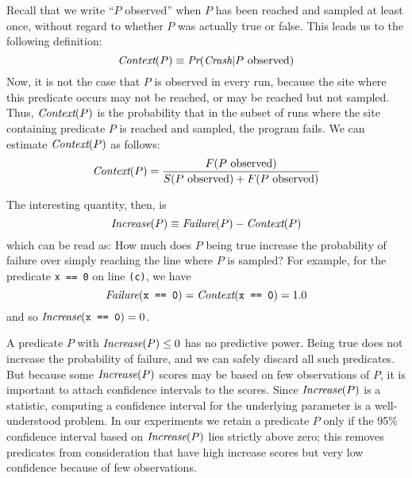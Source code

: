 Recall that we write ``$P$ observed'' when $P$ has been reached
and sampled at least once, without regard to whether $P$ was actually
true or false.
This leads us to the following definition:
\[
\textit{Context}(P) \equiv \textit{Pr}(\textit{Crash} | \text{$P$ observed})
\]
Now, it is not the case that $P$ is observed in every run, because the
site where this predicate occurs may not be reached, or may be reached
but not sampled.
Thus, $\textit{Context}(P)$ is the probability that
in the subset of runs where the site containing predicate $P$ is reached and sampled, the program fails.
We can estimate $\textit{Context}(P)$ as follows:
\[ \textit{Context}(P) = \frac{F(\text{$P$ observed})}{S(\text{$P$ observed}) +
  F(\text{$P$ observed})} \]

The interesting quantity, then, is
\begin{equation*}
 \textit{Increase}(P) \equiv \textit{Failure}(P) - \textit{Context}(P) \label{eqn:1}
\end{equation*}
which can be read as: How much does $P$ being true increase the probability of failure
over simply reaching the line where $P$ is sampled?  For example, for the predicate \texttt{x == 0} on line \texttt{(c)},
we have
\[\textit{Failure}(\texttt{x == 0}) = \textit{Context}(\texttt{x == 0}) = 1.0 \]
and so $\textit{Increase}(\texttt{x == 0}) = 0$.

A predicate $P$ with $\textit{Increase}(P) \leq 0$ has no predictive power.  Being true does not increase the
probability of failure, and we can safely discard all such predicates.
But because some $\textit{Increase}(P)$ scores may be based on few observations of $P$, it is important
to attach confidence intervals to the scores.  Since $\textit{Increase}(P)$ is a statistic, computing
a confidence interval for the underlying parameter is a well-understood problem. In our experiments we retain a predicate $P$ only if 
the 95\% confidence interval based on  $\textit{Increase}(P)$ lies
strictly above zero; this removes predicates from consideration 
that have high increase scores but very low confidence because of 
few observations.

